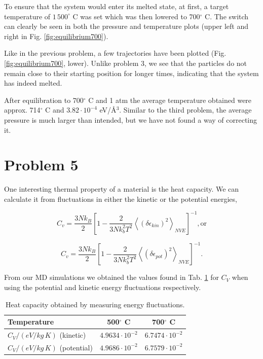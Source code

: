 To ensure that the system would enter its melted state, at first, a target temperature of $1\,500^\circ$ C was set which was then lowered to 700$^\circ$ C. The switch can clearly be seen in both the pressure and temperature plots (upper left and right in Fig. \ref{fig:equilibrium700}).

Like in the previous problem, a few trajectories have been plotted (Fig. \ref{fig:equilibrium700}, lower). Unlike problem 3, we see that the particles do not remain close to their starting position for longer times, indicating that the system has indeed melted.

After equilibration to 700$^\circ$ C and 1 atm the average temperature obtained were approx. 714$^\circ$ C and $3.82 \cdot 10^{-4}$ eV/\r{A}$^3$. Similar to the third problem, the average pressure is much larger than intended, but we have not found a way of correcting it.

\section*{Problem 5}

\noindent One interesting thermal property of a material is the heat capacity. We can calculate it from fluctuations in either the kinetic or the potential energies,

\begin{equation}
C_v=\frac{3Nk_B}{2}\left[1-\frac{2}{3Nk_b^2T^2}\left\langle \left(\delta \epsilon_{kin}\right)^2  \right\rangle_{NVE} \right]^{-1}, \text{or}
\end{equation}

\begin{equation}
C_v=\frac{3Nk_B}{2}\left[1-\frac{2}{3Nk_b^2T^2}\left\langle \left(\delta \epsilon_{pot}\right)^2  \right\rangle_{NVE} \right]^{-1}.
\end{equation}

From our MD simulations we obtained the values found in {Tab. \ref{tab:prob5}} for $C_V$ when using the potential and kinetic energy fluctuations respectively.
\begin{table}[h!]
	\centering
	\caption{Heat capacity obtained by measuring energy fluctuations.}
	\begin{tabular}{l|cc}
		\hline \textbf{Temperature} & \textbf{500$^\circ$ C} & \textbf{700$^\circ$ C} \\ \hline
		$C_V / (\unit{eV/kg\,K})$ (kinetic) & $4.9634 \cdot 10^{-2}$ & $6.7474 \cdot 10^{-2}$ \\
		$C_V / (\unit{eV/kg\,K})$ (potential) & $4.9686 \cdot 10^{-2}$ & $6.7579 \cdot 10^{-2}$ \\ \hline
	\end{tabular}
	\label{tab:prob5}
\end{table}

